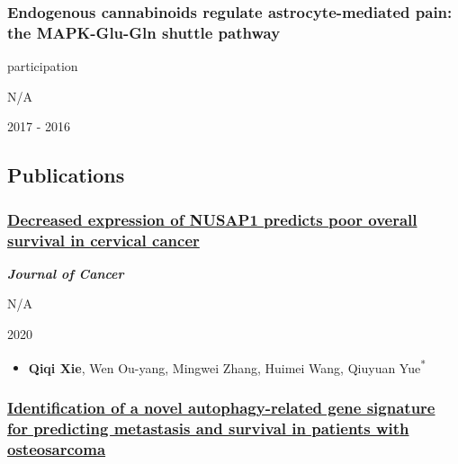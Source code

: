 \documentclass[
]{article}
\providecommand{\tightlist}{%
  \setlength{\itemsep}{0pt}\setlength{\parskip}{0pt}}
\begin{document}
\hypertarget{endogenous-cannabinoids-regulate-astrocyte-mediated-pain-the-mapk-glu-gln-shuttle-pathway}{%
\subsubsection{Endogenous cannabinoids regulate astrocyte-mediated pain:
the MAPK-Glu-Gln shuttle
pathway}\label{endogenous-cannabinoids-regulate-astrocyte-mediated-pain-the-mapk-glu-gln-shuttle-pathway}}

participation

N/A

2017 - 2016

\hypertarget{publications}{%
\subsection{Publications}\label{publications}}

\hypertarget{decreased-expression-of-nusap1-predicts-poor-overall-survival-in-cervical-cancer}{%
\subsubsection{\texorpdfstring{\href{https://www.jcancer.org/v11p2852.htm}{Decreased
expression of NUSAP1 predicts poor overall survival in cervical
cancer}}{Decreased expression of NUSAP1 predicts poor overall survival in cervical cancer}}\label{decreased-expression-of-nusap1-predicts-poor-overall-survival-in-cervical-cancer}}

\emph{\textbf{Journal of Cancer}}

N/A

2020

\begin{itemize}
\tightlist
\item
  \textbf{Qiqi Xie}, Wen Ou-yang, Mingwei Zhang, Huimei Wang, Qiuyuan
  Yue\textsuperscript{*}
\end{itemize}

\hypertarget{identification-of-a-novel-autophagy-related-gene-signature-for-predicting-metastasis-and-survival-in-patients-with-osteosarcoma}{%
\subsubsection{\texorpdfstring{\href{https://www.researchsquare.com/article/rs-19384/v1}{Identification
of a novel autophagy-related gene signature for predicting metastasis
and survival in patients with
osteosarcoma}}{Identification of a novel autophagy-related gene signature for predicting metastasis and survival in patients with osteosarcoma}}\label{identification-of-a-novel-autophagy-related-gene-signature-for-predicting-metastasis-and-survival-in-patients-with-osteosarcoma}}
\end{document}
